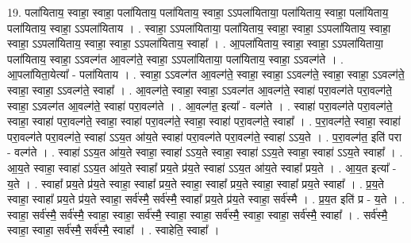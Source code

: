 \documentclass[17pt]{extarticle}
\begin{document}
19. पला॑यिताय॒ स्वाहा॒ स्वाहा॒ पला॑यिताय॒ पला॑यिताय॒ स्वाहा॒ ऽऽपला॑यिताया॒ पला॑यिताय॒ स्वाहा॒ पला॑यिताय॒ पला॑यिताय॒ स्वाहा॒ ऽऽपला॑यिताय । . स्वाहा॒ ऽऽपला॑यिताया॒ पला॑यिताय॒ स्वाहा॒ स्वाहा॒ ऽऽपला॑यिताय॒ स्वाहा॒ स्वाहा॒ ऽऽपला॑यिताय॒ स्वाहा॒ स्वाहा॒ ऽऽपला॑यिताय॒ स्वाहा᳚ । . आ॒पला॑यिताय॒ स्वाहा॒ स्वाहा॒ ऽऽपला॑यिताया॒ पला॑यिताय॒ स्वाहा॒ ऽऽवल्ग॑त आ॒वल्ग॑ते॒ स्वाहा॒ ऽऽपला॑यिताया॒ पला॑यिताय॒ स्वाहा॒ ऽऽवल्ग॑ते । . आ॒पला॑यिता॒येत्या᳚ - पला॑यिताय । . स्वाहा॒ ऽऽवल्ग॑त आ॒वल्ग॑ते॒ स्वाहा॒ स्वाहा॒ ऽऽवल्ग॑ते॒ स्वाहा॒ स्वाहा॒ ऽऽवल्ग॑ते॒ स्वाहा॒ स्वाहा॒ ऽऽवल्ग॑ते॒ स्वाहा᳚ । . आ॒वल्ग॑ते॒ स्वाहा॒ स्वाहा॒ ऽऽवल्ग॑त आ॒वल्ग॑ते॒ स्वाहा॑ परा॒वल्ग॑ते परा॒वल्ग॑ते॒ स्वाहा॒ ऽऽवल्ग॑त आ॒वल्ग॑ते॒ स्वाहा॑ परा॒वल्ग॑ते । . आ॒वल्ग॑त॒ इत्या᳚ - वल्ग॑ते । . स्वाहा॑ परा॒वल्ग॑ते परा॒वल्ग॑ते॒ स्वाहा॒ स्वाहा॑ परा॒वल्ग॑ते॒ स्वाहा॒ स्वाहा॑ परा॒वल्ग॑ते॒ स्वाहा॒ स्वाहा॑ परा॒वल्ग॑ते॒ स्वाहा᳚ । . प॒रा॒वल्ग॑ते॒ स्वाहा॒ स्वाहा॑ परा॒वल्ग॑ते परा॒वल्ग॑ते॒ स्वाहा॑ ऽऽय॒त आ॑य॒ते स्वाहा॑ परा॒वल्ग॑ते परा॒वल्ग॑ते॒ स्वाहा॑ ऽऽय॒ते । . प॒रा॒वल्ग॑त॒ इति॑ परा - वल्ग॑ते । . स्वाहा॑ ऽऽय॒त आ॑य॒ते स्वाहा॒ स्वाहा॑ ऽऽय॒ते स्वाहा॒ स्वाहा॑ ऽऽय॒ते स्वाहा॒ स्वाहा॑ ऽऽय॒ते स्वाहा᳚ । . आ॒य॒ते स्वाहा॒ स्वाहा॑ ऽऽय॒त आ॑य॒ते स्वाहा᳚ प्रय॒ते प्र॑य॒ते स्वाहा॑ ऽऽय॒त आ॑य॒ते स्वाहा᳚ प्रय॒ते । . आ॒य॒त इत्या᳚ - य॒ते । . स्वाहा᳚ प्रय॒ते प्र॑य॒ते स्वाहा॒ स्वाहा᳚ प्रय॒ते स्वाहा॒ स्वाहा᳚ प्रय॒ते स्वाहा॒ स्वाहा᳚ प्रय॒ते स्वाहा᳚ । . प्र॒य॒ते स्वाहा॒ स्वाहा᳚ प्रय॒ते प्र॑य॒ते स्वाहा॒ सर्व॑स्मै॒ सर्व॑स्मै॒ स्वाहा᳚ प्रय॒ते प्र॑य॒ते स्वाहा॒ सर्व॑स्मै । . प्र॒य॒त इति॑ प्र - य॒ते । . स्वाहा॒ सर्व॑स्मै॒ सर्व॑स्मै॒ स्वाहा॒ स्वाहा॒ सर्व॑स्मै॒ स्वाहा॒ स्वाहा॒ सर्व॑स्मै॒ स्वाहा॒ स्वाहा॒ सर्व॑स्मै॒ स्वाहा᳚ । . सर्व॑स्मै॒ स्वाहा॒ स्वाहा॒ सर्व॑स्मै॒ सर्व॑स्मै॒ स्वाहा᳚ । . स्वाहेति॒ स्वाहा᳚ । \newline
\pagebreak
{}
\end{document}
